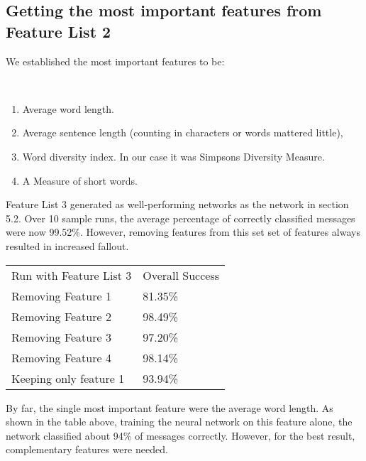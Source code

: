   \subsection{Getting the most important features from Feature List 2}
  We established the most important features to be:
  \label{sec:important-features}
    \begin{poem}\mbox{}\\[-\baselineskip]
      \begin{enumerate} \label{important-features}
        \item Average word length.
        \item Average sentence length (counting in characters or words mattered 
          little), 
        \item Word diversity index. In our case it was Simpsons Diversity
          Measure.  
        \item A Measure of short words. 
      \end{enumerate}     
    \end{poem}
    Feature List $3$ generated as well-performing networks as
    the network in section 5.2.  
    Over 10 sample runs, the average percentage of correctly
    classified messages were now 99.52\%.
    However, removing features from this set set of features always
    resulted in increased fallout. 
    \begin{table}[H]
      \begin{tabular}{ll}
        Run with Feature List 3      & Overall Success  \\
        Removing Feature 1           & 81.35\%          \\
        Removing Feature 2           & 98.49\%          \\ 
        Removing Feature 3           & 97.20\%          \\ 
        Removing Feature 4           & 98.14\%          \\ 
        Keeping only feature 1       & 93.94\%
      \end{tabular}
    \end{table}
    By far, the single most important feature were the average word length.
    As shown in the table above, training the neural network on this feature
    alone, the network classified about 94\% of messages correctly. However,
    for the best result, complementary features were needed.
    
